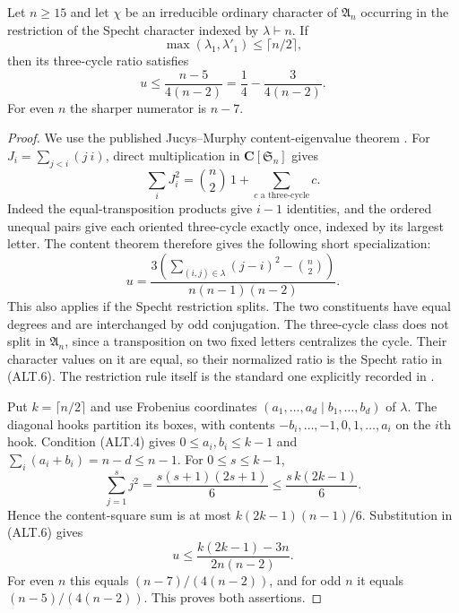 \begin{lemma}
\label{HD-ALT-01b}
Let $n\ge15$ and let $\chi$ be an irreducible ordinary character
of $\mathfrak A_n$ occurring in the restriction of the Specht
character indexed by $\lambda\vdash n$.  If
\[
               \max(\lambda_1,\lambda'_1)\le\lceil n/2\rceil,
                                                               \tag{ALT.4}
\]
then its three-cycle ratio satisfies
\[
             u\le\frac{n-5}{4(n-2)}
               =\frac14-\frac3{4(n-2)}.                  \tag{ALT.5}
\]
For even $n$ the sharper numerator is $n-7$.
\end{lemma}

\begin{proof}
We use the published Jucys--Murphy content-eigenvalue theorem
\cite[Theorem~4.2; author version p.~9]{HD:CMN2022}.
For $J_i=\sum_{j<i}(j\ i)$, direct multiplication in
$\mathbf C[\mathfrak S_n]$ gives
\[
       \sum_iJ_i^2=\binom n2\,1+
                  \sum_{c\text{ a three-cycle}}c.
\]
Indeed the equal-transposition products give $i-1$ identities,
and the ordered unequal pairs give each oriented three-cycle
exactly once, indexed by its largest letter.  The content theorem
therefore gives the following short specialization:
\[
 u=\frac{3\left(\sum_{(i,j)\in\lambda}(j-i)^2-\binom n2\right)}
           {n(n-1)(n-2)}.                                \tag{ALT.6}
\]
This also applies if the Specht restriction splits.  The two
constituents have equal degrees and are interchanged by odd
conjugation.  The three-cycle class does not split in
$\mathfrak A_n$, since a transposition on two fixed letters
centralizes the cycle.  Their character values on it are equal,
so their normalized ratio is the Specht ratio in (ALT.6).
The restriction rule itself is the standard one explicitly
recorded in \cite[Section~2A, p.~604]{HD:BNOT2015}.

Put $k=\lceil n/2\rceil$ and use Frobenius coordinates
$(a_1,\ldots,a_d\mid b_1,\ldots,b_d)$ of $\lambda$.
The diagonal hooks partition its boxes, with contents
$-b_i,\ldots,-1,0,1,\ldots,a_i$ on the $i$th hook.
Condition (ALT.4) gives $0\le a_i,b_i\le k-1$ and
$\sum_i(a_i+b_i)=n-d\le n-1$.  For $0\le s\le k-1$,
\[
 \sum_{j=1}^s j^2=\frac{s(s+1)(2s+1)}6
                  \le\frac{s\,k(2k-1)}6.
\]
Hence the content-square sum is at most
$k(2k-1)(n-1)/6$.  Substitution in (ALT.6) gives
\[
                u\le\frac{k(2k-1)-3n}{2n(n-2)}.
\]
For even $n$ this equals $(n-7)/(4(n-2))$, and for odd $n$
it equals $(n-5)/(4(n-2))$.  This proves both assertions.
\end{proof}


